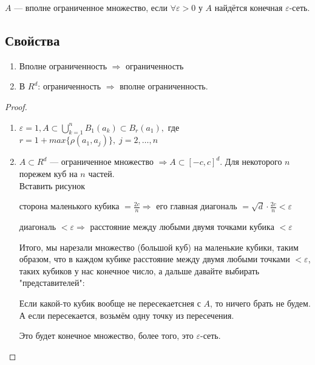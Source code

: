 \begin{conj}
    $A$ --- вполне ограниченное множество, если $\forall \varepsilon > 0$ у $A$ найдётся конечная $\varepsilon$-сеть.
\end{conj}

\subsection*{Свойства} 

\begin{enumerate}
    \item Вполне ограниченность $\Longrightarrow$ ограниченность
    \item В $R^d$: ограниченность $\Longrightarrow$ вполне ограниченность.
\end{enumerate}

\begin{proof}
    $ \quad $ \\
    \begin{enumerate}
        \item $\varepsilon = 1, A \subset \bigcup\limits_{k=1}^{n} B_1(a_k) \subset B_r(a_1),$ где $r = 1 + max \{ \rho(a_1, a_j) \}, \; j = 2, \dots, n$
        \item $A \subset R^d$ --- ограниченное множество $\Longrightarrow A \subset [-c, c]^d$. Для некоторого $n$ порежем куб на $n$ частей. \\

        Вставить рисунок %

        сторона маленького кубика $= \frac{2c}{n} \Longrightarrow$ его главная диагональ $= \sqrt{d} \cdot \frac{2c}{n} < \varepsilon$

        диагональ $< \varepsilon \Longrightarrow$ расстояние между любыми двумя точками кубика $< \varepsilon$

        Итого, мы нарезали множество (большой куб) на маленькие кубики, таким образом, что в каждом кубике расстояние между двумя любыми точками $< \varepsilon$,
        таких кубиков у нас конечное число, а дальше давайте выбирать "представителей":

        Если какой-то кубик вообще не пересекаетснея с $A$, то ничего брать не будем. А если пересекается, возьмём одну точку из пересечения.

        Это будет конечное множество, более того, это $\varepsilon$-сеть.
    \end{enumerate}
\end{proof}


